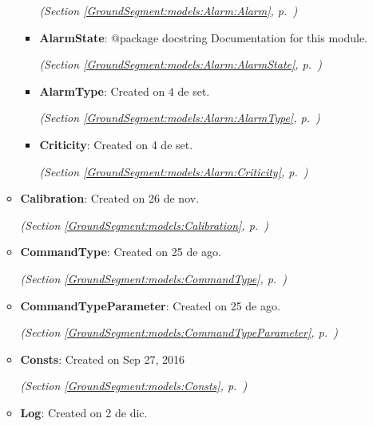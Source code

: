 \begin{itemize}
\begin{itemize}
\begin{itemize}
  \textit{(Section \ref{GroundSegment:models:Alarm:Alarm}, p.~\pageref{GroundSegment:models:Alarm:Alarm})}

        \item \textbf{AlarmState}: @package docstring Documentation for this module.



  \textit{(Section \ref{GroundSegment:models:Alarm:AlarmState}, p.~\pageref{GroundSegment:models:Alarm:AlarmState})}

        \item \textbf{AlarmType}: Created on 4 de set.



  \textit{(Section \ref{GroundSegment:models:Alarm:AlarmType}, p.~\pageref{GroundSegment:models:Alarm:AlarmType})}

        \item \textbf{Criticity}: Created on 4 de set.



  \textit{(Section \ref{GroundSegment:models:Alarm:Criticity}, p.~\pageref{GroundSegment:models:Alarm:Criticity})}

      \end{itemize}
    \item \textbf{Calibration}: Created on 26 de nov.



  \textit{(Section \ref{GroundSegment:models:Calibration}, p.~\pageref{GroundSegment:models:Calibration})}

    \item \textbf{CommandType}: Created on 25 de ago.



  \textit{(Section \ref{GroundSegment:models:CommandType}, p.~\pageref{GroundSegment:models:CommandType})}

    \item \textbf{CommandTypeParameter}: Created on 25 de ago.



  \textit{(Section \ref{GroundSegment:models:CommandTypeParameter}, p.~\pageref{GroundSegment:models:CommandTypeParameter})}

    \item \textbf{Consts}: Created on Sep 27, 2016



  \textit{(Section \ref{GroundSegment:models:Consts}, p.~\pageref{GroundSegment:models:Consts})}

    \item \textbf{Log}: Created on 2 de dic.




\end{itemize}
\end{itemize}
